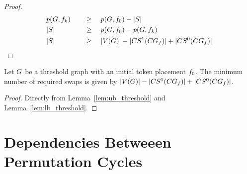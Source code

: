 \documentclass[msc,english,table,xcdraw]{ppgccufmg}
\begin{document}
\begin{proof}
    \begin{alignat}{2}
    \centering
    \label{equ:lower_bound}
    & \applyFunc{p}{\graphG, \mapFunc_{k}} \quad && \geq \quad \applyFunc{p}{\graphG, \mapFunc_{0}} - \sizeof{\swapSeq} \nonumber \\
    & \sizeof{\swapSeq} \quad && \geq \quad \applyFunc{p}{\graphG, \mapFunc_{0}} - \applyFunc{p}{\graphG, \mapFunc_{k}} \nonumber \\
    & \sizeof{\swapSeq} \quad && \geq \quad \sizeof{\vertexFunc{\graphG}} - 
\sizeof{\applyFunc{\oneCycles}{\conflictGraph_{\mapFunc}}} +
\sizeof{\applyFunc{\zeroCycles}{\conflictGraph_{\mapFunc}}}
    \end{alignat}
    
\end{proof}



\begin{theorem}
\label{cor:threshold_pol}
Let $G$ be a threshold graph with an initial token placement $f_{0}$.
The minimum number of required swaps is given by $|V(G)| - |CS^{1}(CG_{f})| +
|CS^{0}(CG_{f})|$.
\end{theorem}

\begin{proof}
Directly from Lemma~\ref{lem:ub_threshold} and Lemma~\ref{lem:lb_threshold}.
\end{proof}

\section{Dependencies Betweeen Permutation Cycles}
\label{sec:deppermcycles}

\end{document}
